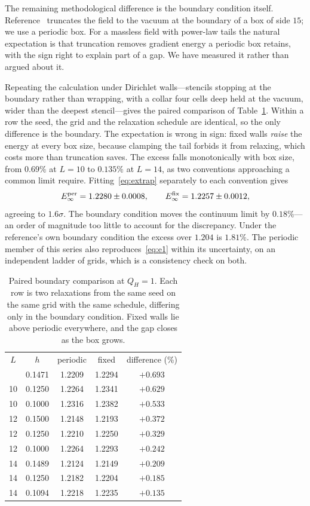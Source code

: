 \documentclass[aps,prd,preprint,nofootinbib,longbibliography]{revtex4-2}
\newcommand{\Qh}{Q_H}
\begin{document}
The remaining methodological difference is the boundary condition itself.
Reference~\cite{sutcliffe2007} truncates the field to the vacuum at the boundary
of a box of side $15$; we use a periodic box. For a massless field with
power-law tails the natural expectation is that truncation removes gradient
energy a periodic box retains, with the sign right to explain part of a gap. We
have measured it rather than argued about it.

Repeating the calculation under Dirichlet walls---stencils stopping at the
boundary rather than wrapping, with a collar four cells deep held at the vacuum,
wider than the deepest stencil---gives the paired comparison of
Table~\ref{tab:boundary}. Within a row the seed, the grid and the relaxation
schedule are identical, so the only difference is the boundary. The expectation
is wrong in sign: fixed walls \emph{raise} the energy at every box size, because
clamping the tail forbids it from relaxing, which costs more than truncation
saves. The excess falls monotonically with box size, from $0.69\%$ at $L=10$ to
$0.135\%$ at $L=14$, as two conventions approaching a common limit require.
Fitting~\eqref{eq:extrap} separately to each convention gives
\begin{equation}
E_\infty^{\rm per}=1.2280\pm0.0008, \qquad
E_\infty^{\rm fix}=1.2257\pm0.0012 ,
\label{eq:boundary}
\end{equation}
agreeing to $1.6\sigma$. The boundary condition moves the continuum limit by
$0.18\%$---an order of magnitude too little to account for the discrepancy.
Under the reference's own boundary condition the excess over $1.204$ is
$1.81\%$. The periodic member of this series also reproduces~\eqref{eq:e1}
within its uncertainty, on an independent ladder of grids, which is a
consistency check on both.

\begin{table}[t]
\caption{Paired boundary comparison at $\Qh=1$. Each row is two relaxations from
the same seed on the same grid with the same schedule, differing only in the
boundary condition. Fixed walls lie above periodic everywhere, and the gap
closes as the box grows.}
\label{tab:boundary}
\begin{ruledtabular}
\begin{tabular}{ccccc}
$L$ & $h$ & periodic & fixed & difference (\%) \\
\colrule
10 & 0.1471 & 1.2209 & 1.2294 & $+0.693$ \\
10 & 0.1250 & 1.2264 & 1.2341 & $+0.629$ \\
10 & 0.1000 & 1.2316 & 1.2382 & $+0.533$ \\
12 & 0.1500 & 1.2148 & 1.2193 & $+0.372$ \\
12 & 0.1250 & 1.2210 & 1.2250 & $+0.329$ \\
12 & 0.1000 & 1.2264 & 1.2293 & $+0.242$ \\
14 & 0.1489 & 1.2124 & 1.2149 & $+0.209$ \\
14 & 0.1250 & 1.2182 & 1.2204 & $+0.185$ \\
14 & 0.1094 & 1.2218 & 1.2235 & $+0.135$ \\
\end{tabular}
\end{ruledtabular}
\end{table}
\end{document}

